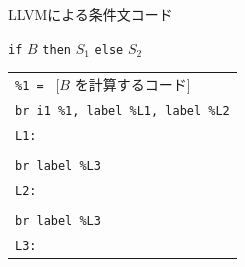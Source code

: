 \documentclass[dvipdfmx]{beamer}
\begin{document}












\begin{frame}{LLVMによる条件文コード}
	
	\texttt{if} {$B$} \texttt{then} {$S_1$} \texttt{else} {$S_2$}

	\vspace*{5mm}

	\begin{tabular}{l}
		\texttt{\%1 = } [$B$ を計算するコード]\\
		\texttt{br i1 \%1, label \%L1, label \%L2}\\
		\texttt{L1:}\\
    \quad [$S_1$のコード]\\
		\texttt{br label \%L3}\\
		\texttt{L2:}\\
		\quad [$S_2$のコード]\\
		\texttt{br label \%L3}\\
		\texttt{L3:}
	\end{tabular}
	


\end{frame}
\end{document}
